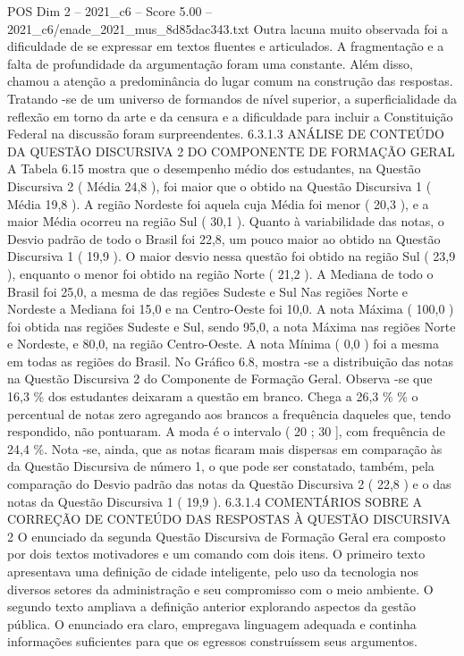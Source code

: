 \begin{textsample}{POS Dim 2 – 2021\_c6 – Score 5.00 – 2021\_c6/enade\_2021\_mus\_8d85dac343.txt}
Outra lacuna muito observada foi a dificuldade de se expressar em textos fluentes e articulados.
A fragmentação e a falta de profundidade da argumentação foram uma constante.
Além disso, chamou a atenção a predominância do lugar comum na construção das respostas.
Tratando -se de um universo de formandos de nível superior, a superficialidade da reflexão em torno da arte e da censura e a dificuldade para incluir a Constituição Federal na discussão foram surpreendentes. 6.3.1.3 ANÁLISE DE CONTEÚDO DA QUESTÃO DISCURSIVA 2 DO COMPONENTE DE FORMAÇÃO GERAL A Tabela 6.15 mostra que o desempenho médio dos estudantes, na Questão Discursiva 2 ( Média 24,8 ), foi maior que o obtido na Questão Discursiva 1 ( Média 19,8 ).
A região Nordeste foi aquela cuja Média foi menor ( 20,3 ), e a maior Média ocorreu na região Sul ( 30,1 ).
Quanto à variabilidade das notas, o Desvio padrão de todo o Brasil foi 22,8, um pouco maior ao obtido na Questão Discursiva 1 ( 19,9 ).
O maior desvio nessa questão foi obtido na região Sul ( 23,9 ), enquanto o menor foi obtido na região Norte ( 21,2 ).
A Mediana de todo o Brasil foi 25,0, a mesma de das regiões Sudeste e Sul Nas regiões Norte e Nordeste a Mediana foi 15,0 e na Centro-Oeste foi 10,0.
A nota Máxima ( 100,0 ) foi obtida nas regiões Sudeste e Sul, sendo 95,0, a nota Máxima nas regiões Norte e Nordeste, e 80,0, na região Centro-Oeste.
A nota Mínima ( 0,0 ) foi a mesma em todas as regiões do Brasil.
No Gráfico 6.8, mostra -se a distribuição das notas na Questão Discursiva 2 do Componente de Formação Geral.
Observa -se que 16,3 \% dos estudantes deixaram a questão em branco.
Chega a 26,3 \% \% o percentual de notas zero agregando aos brancos a frequência daqueles que, tendo respondido, não pontuaram.
A moda é o intervalo ( 20 ; 30 ], com frequência de 24,4 \%.
Nota -se, ainda, que as notas ficaram mais dispersas em comparação às da Questão Discursiva de número 1, o que pode ser constatado, também, pela comparação do Desvio padrão das notas da Questão Discursiva 2 ( 22,8 ) e o das notas da Questão Discursiva 1 ( 19,9 ). 6.3.1.4 COMENTÁRIOS SOBRE A CORREÇÃO DE CONTEÚDO DAS RESPOSTAS À QUESTÃO DISCURSIVA 2 O enunciado da segunda Questão Discursiva de Formação Geral era composto por dois textos motivadores e um comando com dois itens.
O primeiro texto apresentava uma definição de cidade inteligente, pelo uso da tecnologia nos diversos setores da administração e seu compromisso com o meio ambiente.
O segundo texto ampliava a definição anterior explorando aspectos da gestão pública.
O enunciado era claro, empregava linguagem adequada e continha informações suficientes para que os egressos construíssem seus argumentos.

\end{textsample}
